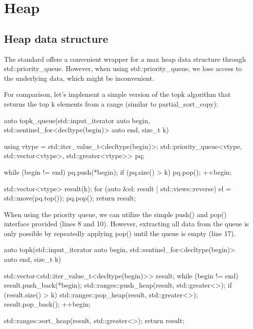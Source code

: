 \section{Heap}

\subsection{Heap data structure}

The standard offers a convenient wrapper for a max heap data structure through std::priority\_queue. However, when using std::priority\_queue, we lose access to the underlying data, which might be inconvenient.




For comparison, let’s implement a simple version of the topk algorithm that returns the top k elements from a range (similar to partial\_sort\_copy):

\begin{box-note}
\begin{cppcode}
auto topk_queue(std::input_iterator auto begin, std::sentinel_for<decltype(begin)> auto end, 
                size_t k) {

    using vtype = std::iter_value_t<decltype(begin)>;
    std::priority_queue<vtype, std::vector<vtype>, std::greater<vtype>> pq;

    while (begin != end) {
        pq.push(*begin);
        if (pq.size() > k)
            pq.pop();
        ++begin;
    }

    std::vector<vtype> result(k);
    for (auto &el: result | std::views::reverse) {
        el = std::move(pq.top());
        pq.pop();
    }
    return result;    
}
\end{cppcode}
\end{box-note}

When using the priority queue, we can utilize the simple push() and pop() interface provided (lines 8 and 10). However, extracting all data from the queue is only possible by repeatedly applying pop() until the queue is empty (line 17).

\begin{box-note}
\begin{cppcode}
auto topk(std::input_iterator auto begin, std::sentinel_for<decltype(begin)> auto end, 
          size_t k) {
          
    std::vector<std::iter_value_t<decltype(begin)>> result;
    while (begin != end) {
        result.push_back(*begin);
        std::ranges::push_heap(result, std::greater<>{});
        if (result.size() > k) {
            std::ranges::pop_heap(result, std::greater<>{});
            result.pop_back();
        }
        ++begin;
    }
    
    std::ranges::sort_heap(result, std::greater<>{});
    return result;    
}
\end{cppcode}
\end{box-note}

